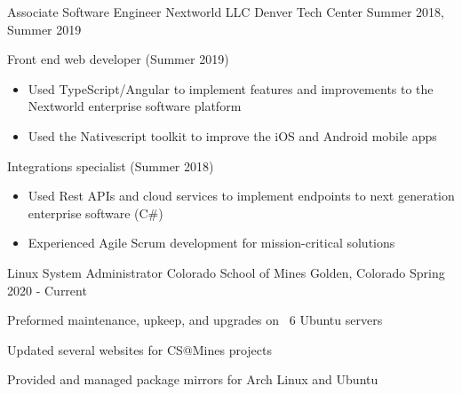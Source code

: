 \vspace{-2.0mm}

\begin{cventries}

  \cventry
    {Associate Software Engineer} %
    {Nextworld LLC} %
    {Denver Tech Center} %
    {Summer 2018, Summer 2019} %
    {
      \begin{cvitems} %
      \item {Front end web developer (Summer 2019)}
      \begin{itemize}
            \item {Used TypeScript/Angular to implement features and
    improvements to the Nextworld enterprise software platform}
        \item {Used the Nativescript toolkit to improve the iOS and
    Android mobile apps}
    \end{itemize}
        \item {Integrations specialist (Summer 2018)}
        \begin{itemize}
                \item {Used Rest APIs and cloud services to implement
                            endpoints to next generation enterprise software (C\#)}
        \item {Experienced Agile Scrum
    development for mission-critical solutions}
    \end{itemize}
      \end{cvitems}
    }

    \cventry
    {Linux System Administrator}
    {Colorado School of Mines}
    {Golden, Colorado}
    {Spring 2020 - Current}
    {
        \begin{cvitems}
        \item Preformed maintenance, upkeep, and upgrades on ~6 Ubuntu servers
        \item Updated several websites for CS@Mines projects
        \item Provided and managed package mirrors for Arch Linux and Ubuntu
        \end{cvitems}
    }



\end{cventries}
